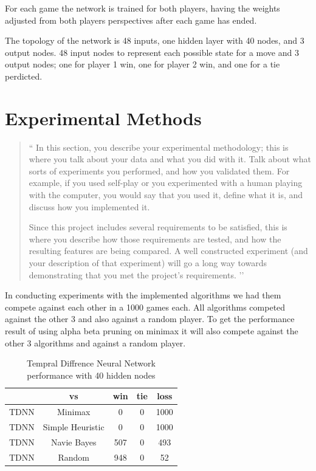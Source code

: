 \documentclass[12pt,letterpaper]{article}
\begin{document}
For each game the network is trained for both players, having the weights adjusted from both players perspectives after each game has ended.

The topology of the network is 48 inputs, one hidden layer with 40 nodes, and 3 output nodes. 48 input nodes to represent each possible state for a move and 3 output nodes; one for player 1 win, one for player 2 win, and one for a tie perdicted. 

\section{Experimental Methods}
\begin{quote}
`` 
In this section, you describe your experimental methodology; this is where you talk
about your data and what you did with it.  Talk about what sorts of experiments
you performed, and how you validated them.  For example, if you used self-play
or you experimented with a human playing with the computer, you would say that 
you used it, define what it is, and discuss how you implemented it.  

Since this project includes several requirements to be satisfied, this is where you describe
how those requirements are tested, and how the resulting features are being compared.
A well constructed experiment (and your description of that experiment) will go a long
way towards demonstrating that you met the project's requirements.
’’
\end{quote}

In conducting experiments with the implemented algorithms we had them compete against each other in a 1000 games each. All algorithms competed against the other 3 and also against a random player. To get the performance result of using alpha beta pruning on minimax it will also compete against the other 3 algorithms and against a random player. 


\newpage

\begin{table}
\begin{center}
\begin{tabular}{|c||c|c|c|c|}
\hline
& vs & win & tie & loss\\
\hline \hline
TDNN & Minimax & 0 & 0 & 1000\\
\hline 
TDNN & Simple Heuristic & 0 & 0 & 1000\\
\hline 
TDNN & Navie Bayes & 507 & 0 & 493\\
\hline 
TDNN & Random & 948 & 0 & 52\\
\hline 
\end{tabular}
\end{center}
\caption{Tempral Diffrence Neural Network performance with 40 hidden nodes}
\label{TDNNtable}
\end{table}
\end{document}
